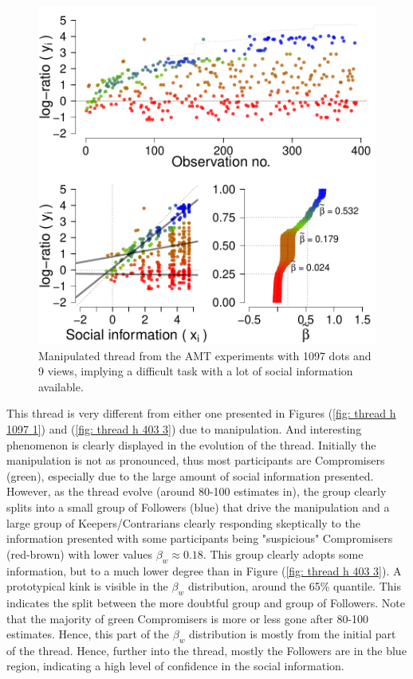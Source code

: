 \documentclass[10pt,a4paper,twocolumn,lineno]{article}
\begin{document}
\begin{figure}[htbp]
	\centering\includegraphics[width=.5\textwidth]{../plots/m10979.pdf}
	\caption{Manipulated thread from the AMT experiments with 1097 dots and 9 views, implying a difficult task with a lot of social information available.}\label{fig: thread m 1097 9}
\end{figure}

This thread is very different from either one presented in Figures (\ref{fig: thread h 1097 1}) and (\ref{fig: thread h 403 3}) due to manipulation. And interesting phenomenon is clearly displayed in the evolution of the thread. Initially the manipulation is not as pronounced, thus most participants are Compromisers (green), especially due to the large amount of social information presented. However, as the thread evolve (around 80-100 estimates in), the group clearly splits into a small group of Followers (blue) that drive the manipulation and a large group of Keepers/Contrarians clearly responding skeptically to the information presented with some participants being "suspicious" Compromisers (red-brown) with lower values $\beta_w\approx 0.18$. This group clearly adopts some information, but to a much lower degree than in Figure (\ref{fig: thread h 403 3}). A prototypical kink is visible in the $\beta_w$ distribution, around the 65\% quantile. This indicates the split between the more doubtful group and group of Followers. Note that the majority of green Compromisers is more or less gone after 80-100 estimates. Hence, this part of the $\beta_w$ distribution is mostly from the initial part of the thread. Hence, further into the thread, mostly the Followers are in the blue region, indicating a high level of confidence in the social information.
\end{document}
